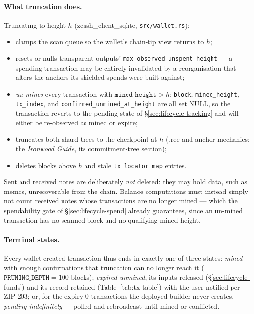 \documentclass[11pt,a4paper]{article}
\theoremstyle{definition}
\begin{document}
\paragraph{What truncation does.} Truncating to height $h$
(\textsf{zcash\_client\_sqlite}, \texttt{src/wallet.rs}):
\begin{itemize}[leftmargin=*]
\item clamps the scan queue so the wallet's chain-tip view returns to $h$;
\item resets or nulls transparent outputs'
  \texttt{max\_observed\_unspent\_height} --- a spending transaction may be
  entirely invalidated by a reorganisation that alters the anchors its
  shielded spends were built against;
\item \emph{un-mines} every transaction with $\mathtt{mined\_height} > h$:
  \texttt{block}, \texttt{mined\_height}, \texttt{tx\_index}, and
  \texttt{confirmed\_unmined\_at\_height} are all set NULL, so the
  transaction reverts to the pending state of
  \S\ref{sec:lifecycle-tracking} and will either be re-observed as mined
  or expire;
\item truncates both shard trees to the checkpoint at $h$ (tree and anchor
  mechanics: the \emph{Ironwood Guide}, its commitment-tree section);
\item deletes blocks above $h$ and stale \texttt{tx\_locator\_map} entries.
\end{itemize}
Sent and received notes are deliberately \emph{not} deleted: they may hold
data, such as memos, unrecoverable from the chain. Balance computations
must instead simply not count received notes whose transactions are no
longer mined --- which the spendability gate of
\S\ref{sec:lifecycle-spend} already guarantees, since an un-mined
transaction has no scanned block and no qualifying mined height.

\paragraph{Terminal states.} Every wallet-created transaction thus ends in
exactly one of three states: \emph{mined} with enough confirmations that
truncation can no longer reach it ($\mathtt{PRUNING\_DEPTH} = 100$ blocks);
\emph{expired unmined}, its inputs released
(\S\ref{sec:lifecycle-funds}) and its record retained
(Table~\ref{tab:tx-table}) with the user notified per ZIP-203; or, for the
expiry-$0$ transactions the deployed builder never creates, \emph{pending
indefinitely} --- polled and rebroadcast until mined or conflicted.
\end{document}
